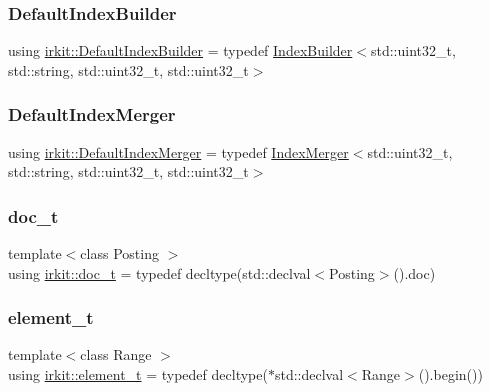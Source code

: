 \mbox{\label{namespaceirkit_aefd5a5c2f1136e9c2224a4b4d659d4a9}} 
\subsubsection{\texorpdfstring{Default\+Index\+Builder}{DefaultIndexBuilder}}
{\footnotesize\ttfamily using \hyperlink{namespaceirkit_aefd5a5c2f1136e9c2224a4b4d659d4a9}{irkit\+::\+Default\+Index\+Builder} = typedef \hyperlink{classirkit_1_1IndexBuilder}{Index\+Builder}$<$std\+::uint32\+\_\+t, std\+::string, std\+::uint32\+\_\+t, std\+::uint32\+\_\+t$>$}

\mbox{\label{namespaceirkit_a434fa5b33380811cba36a6b46d487373}} 
\subsubsection{\texorpdfstring{Default\+Index\+Merger}{DefaultIndexMerger}}
{\footnotesize\ttfamily using \hyperlink{namespaceirkit_a434fa5b33380811cba36a6b46d487373}{irkit\+::\+Default\+Index\+Merger} = typedef \hyperlink{classirkit_1_1IndexMerger}{Index\+Merger}$<$std\+::uint32\+\_\+t, std\+::string, std\+::uint32\+\_\+t, std\+::uint32\+\_\+t$>$}

\mbox{\label{namespaceirkit_a595d83053e112c98ab2a1b65e5dd74be}} 
\subsubsection{\texorpdfstring{doc\+\_\+t}{doc\_t}}
{\footnotesize\ttfamily template$<$class Posting $>$ \\
using \hyperlink{namespaceirkit_a595d83053e112c98ab2a1b65e5dd74be}{irkit\+::doc\+\_\+t} = typedef decltype(std\+::declval$<$Posting$>$().doc)}

\mbox{\label{namespaceirkit_a40deb8b0d47ecaada4b47270b97d5469}} 
\subsubsection{\texorpdfstring{element\+\_\+t}{element\_t}}
{\footnotesize\ttfamily template$<$class Range $>$ \\
using \hyperlink{namespaceirkit_a40deb8b0d47ecaada4b47270b97d5469}{irkit\+::element\+\_\+t} = typedef decltype($\ast$std\+::declval$<$Range$>$().begin())}



